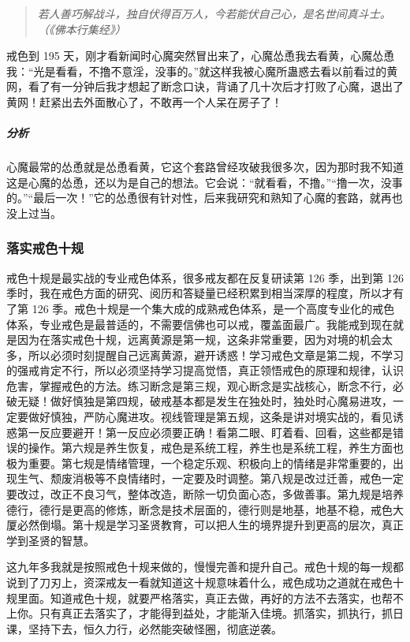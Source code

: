 \begin{quote}\it
    若人善巧解战斗，独自伏得百万人，今若能伏自己心，是名世间真斗士。（《佛本行集经》）
\end{quote}

\begin{case}
    戒色到 195 天，刚才看新闻时心魔突然冒出来了，心魔怂恿我去看黄，心魔怂恿我：“光是看看，不撸不意淫，没事的。”就这样我被心魔所蛊惑去看以前看过的黄网，看了有一分钟后我才想起了断念口诀，背诵了几十次后才打败了心魔，退出了黄网！赶紧出去外面散心了，不敢再一个人呆在房子了！
    \subparagraph{分析} 心魔最常的怂恿就是怂恿看黄，它这个套路曾经攻破我很多次，因为那时我不知道这是心魔的怂恿，还以为是自己的想法。它会说：“就看看，不撸。”“撸一次，没事的。”“最后一次！”它的怂恿很有针对性，后来我研究和熟知了心魔的套路，就再也没上过当。
\end{case}

\subsubsection{落实戒色十规}

戒色十规是最实战的专业戒色体系，很多戒友都在反复研读第 126 季，出到第 126 季时，我在戒色方面的研究、阅历和答疑量已经积累到相当深厚的程度，所以才有了第 126 季。戒色十规是一个集大成的成熟戒色体系，是一个高度专业化的戒色体系，专业戒色是最普适的，不需要信佛也可以戒，覆盖面最广。我能戒到现在就是因为在落实戒色十规，远离黄源是第一规，这条非常重要，因为对境的机会太多，所以必须时刻提醒自己远离黄源，避开诱惑！学习戒色文章是第二规，不学习的强戒肯定不行，所以必须坚持学习提高觉悟，真正领悟戒色的原理和规律，认识危害，掌握戒色的方法。练习断念是第三规，观心断念是实战核心，断念不行，必破无疑！做好慎独是第四规，破戒基本都是发生在独处时，独处时心魔易进攻，一定要做好慎独，严防心魔进攻。视线管理是第五规，这条是讲对境实战的，看见诱惑第一反应要避开！第一反应必须要正确！看第二眼、盯着看、回看，这些都是错误的操作。第六规是养生恢复，戒色是系统工程，养生也是系统工程，养生方面也极为重要。第七规是情绪管理，一个稳定乐观、积极向上的情绪是非常重要的，出现生气、颓废消极等不良情绪时，一定要及时调整。第八规是改过迁善，戒色一定要改过，改正不良习气，整体改造，断除一切负面心态，多做善事。第九规是培养德行，德行是更高的修炼，断念是技术层面的，德行则是地基，地基不稳，戒色大厦必然倒塌。第十规是学习圣贤教育，可以把人生的境界提升到更高的层次，真正学到圣贤的智慧。

这九年多我就是按照戒色十规来做的，慢慢完善和提升自己。戒色十规的每一规都说到了刀刃上，资深戒友一看就知道这十规意味着什么，戒色成功之道就在戒色十规里面。知道戒色十规，就要严格落实，真正去做，再好的方法不去落实，也帮不上你。只有真正去落实了，才能得到益处，才能渐入佳境。抓落实，抓执行，抓日课，坚持下去，恒久力行，必然能突破怪圈，彻底逆袭。

